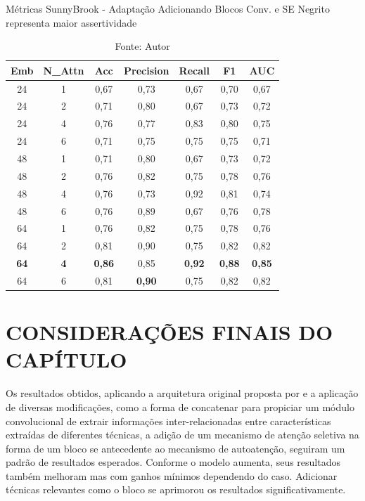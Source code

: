 \begin{table}[htbp]
\centering
\caption{Métricas SunnyBrook - Adaptação Adicionando Blocos Conv. e SE
\newline Negrito representa maior assertividade}
\begin{tabular}{ccccccc}
\toprule
\textbf{Emb} & \textbf{N\_Attn} & \textbf{Acc} & \textbf{Precision} & \textbf{Recall} & \textbf{F1} & \textbf{AUC} \\
\midrule
24 & 1 & 0,67 & 0,73 & 0,67 & 0,70 & 0,67 \\
24 & 2 & 0,71 & 0,80 & 0,67 & 0,73 & 0,72 \\
24 & 4 & 0,76 & 0,77 & 0,83 & 0,80 & 0,75 \\
24 & 6 & 0,71 & 0,75 & 0,75 & 0,75 & 0,71 \\
48 & 1 & 0,71 & 0,80 & 0,67 & 0,73 & 0,72 \\
48 & 2 & 0,76 & 0,82 & 0,75 & 0,78 & 0,76 \\
48 & 4 & 0,76 & 0,73 & 0,92 & 0,81 & 0,74 \\
48 & 6 & 0,76 & 0,89 & 0,67 & 0,76 & 0,78 \\
64 & 1 & 0,76 & 0,82 & 0,75 & 0,78 & 0,76 \\
64 & 2 & 0,81 & 0,90 & 0,75 & 0,82 & 0,82 \\
\textbf{64} & \textbf{4} & \textbf{0,86} & 0,85 & \textbf{0,92} & \textbf{0,88} & \textbf{0,85} \\
64 & 6 & 0,81 & \textbf{0,90} & 0,75 & 0,82 & 0,82 \\
\bottomrule
\end{tabular}
\caption*{Fonte: Autor}
\label{tab:metrics_sunny_se}
\end{table}

\section{CONSIDERAÇÕES FINAIS DO CAPÍTULO} 
\label{sec:cap6_consideracoes_finais}

Os resultados obtidos, aplicando a arquitetura original proposta por  e a aplicação de diversas modificações, como a forma de concatenar para propiciar um módulo convolucional de extrair informações inter-relacionadas entre características extraídas de diferentes técnicas, a adição de um mecanismo de atenção seletiva na forma de um bloco \gls{se} antecedente ao mecanismo de autoatenção, seguiram um padrão de resultados esperados. Conforme o modelo aumenta, seus resultados também melhoram mas com ganhos mínimos dependendo do caso. Adicionar técnicas relevantes como o bloco \gls{se} aprimorou os resultados significativamente.

